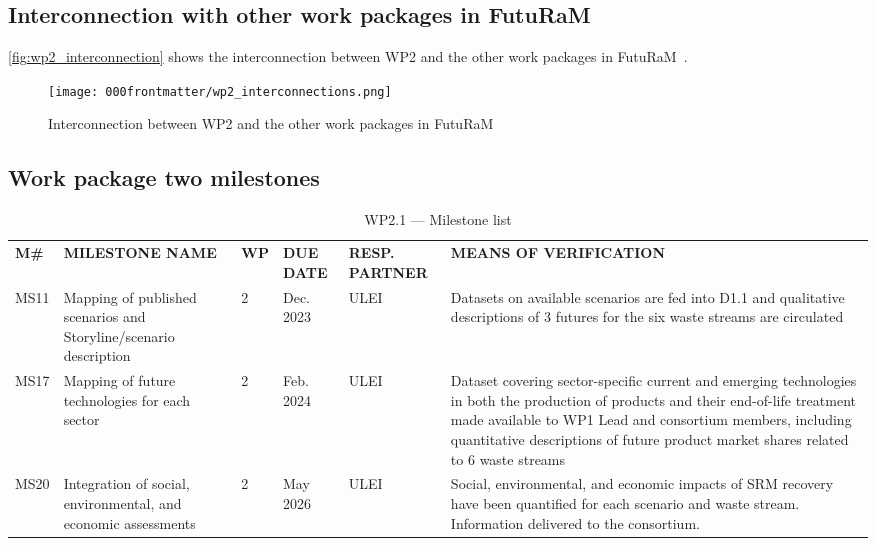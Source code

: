 \begin{landscape}
\subsection{Interconnection with other work packages in FutuRaM}


\autoref{fig:wp2_interconnection} shows the interconnection between WP2 and the other work packages in FutuRaM~\cite{futuram2022ga}.

\begin{figure}[ht!]


    \vspace{1cm}
    \centering
    \texttt{[image: 000frontmatter/wp2\_interconnections.png]}
    \caption{Interconnection between WP2 and the other work packages in FutuRaM}
    \label{fig:wp2_interconnection}
\end{figure}
\end{landscape}

\begin{landscape}
        \subsection{Work package two milestones}
        \small
        \centering
        \noindent
        \begin{table}[ht!]
        \caption{WP2.1 --- Milestone list}\label{tab:milestones}
        \begin{tabular}{|L{1cm}|L{7cm}|L{1cm}|L{2cm}|L{3cm}|L{9cm}|}
        \hline
        \color{white}\textbf{M\#} & \color{white}\textbf{MILESTONE NAME} & \color{white}\textbf{WP} & \color{white}\textbf{DUE DATE} & \color{white}\textbf{RESP. PARTNER} & \color{white}\textbf{MEANS OF VERIFICATION} \\
        \hline
        MS11 & Mapping of published scenarios and Storyline/scenario description & 2 & Dec. 2023 & ULEI & Datasets on available scenarios are fed into D1.1 and qualitative descriptions of 3 futures for the six waste streams are circulated \\
        \hline
        MS17 & Mapping of future technologies for each sector & 2 & Feb. 2024 & ULEI & Dataset covering sector-specific current and emerging technologies in both the production of products and their end-of-life treatment made available to WP1 Lead and consortium members, including quantitative descriptions of future product market shares related to 6 waste streams \\
        \hline
        MS20 & Integration of social, environmental, and economic assessments & 2 & May 2026 & ULEI & Social, environmental, and economic impacts of SRM recovery have been quantified for each scenario and waste stream. Information delivered to the consortium. \\
        \hline
        \end{tabular}
        \end{table}
\end{landscape}

